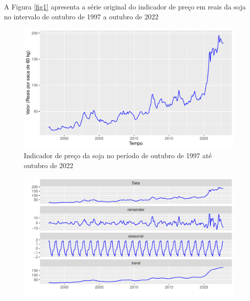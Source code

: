 \documentclass[
	12pt,				%
	openright,			%
	oneside,      %
	a4paper,			%
	english,			%
	french,				%
	spanish,			%
	brazil,				%
	]{abntex2}\usepackage[]{graphicx}\usepackage[table]{xcolor}
\makeatletter
\def\maxwidth{ %
  \ifdim\Gin@nat@width>\linewidth
    \linewidth
  \else
    \Gin@nat@width
  \fi
}
\newenvironment{knitrout}{}{} %
\theoremstyle{definition}
\theoremstyle{remark}
\makeatother
\begin{document}
A Figura \ref{fig1} apresenta a série original do indicador de preço em reais da soja no intervalo de outubro de 1997 a outubro de 2022 

\begin{knitrout}
\color{fgcolor}\begin{figure}[H]
\includegraphics[width=\maxwidth]{figure/script1-1} \caption[Indicador de preço da soja no período de outubro de 1997 até outubro de 2022 \label{fig1}]{Indicador de preço da soja no período de outubro de 1997 até outubro de 2022 \label{fig1}}\label{fig:script1}
\end{figure}

\end{knitrout}




\begin{knitrout}
\color{fgcolor}\begin{figure}
\includegraphics[width=\maxwidth]{figure/script2-1} \end{figure}

\end{knitrout}
\end{document}
